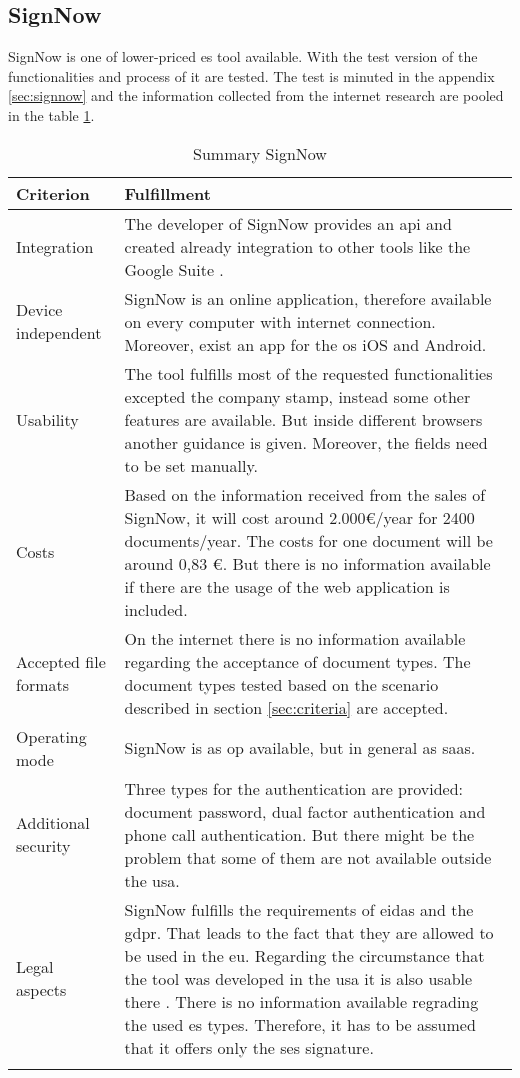 \subsection{SignNow}
SignNow is one of lower-priced \gls{es} tool available. With the test version of the functionalities and process of it are tested. The test is minuted in the appendix \ref{sec:signnow} and the information collected from the internet research are pooled in the table \ref{tab:signnow}.
	\begin{longtable}{|p{4cm}|p{10cm}|} \hline
		Criterion & Fulfillment \\ \hline
		Integration & The developer of SignNow provides an \gls{api} and created already integration to other tools like the Google Suite \parencite{signnow2018enterprise,signnow2018price}.\\ \hline
		Device independent & SignNow is an online application, therefore available on every computer with internet connection. Moreover, exist an \gls{app} for the \gls{os} iOS and Android.\\ \hline
		Usability & The tool fulfills most of the requested functionalities excepted the company stamp, instead some other features are available. But inside different browsers another guidance is given. Moreover, the fields need to be set manually.\\ \hline
		Costs & Based on the information received from the sales of SignNow, it will cost around 2.000\euro /year for 2400 documents/year. The costs for one document will be around 0,83 \euro. But there is no information available if there are the usage of the web application is included. \\ \hline
		Accepted file formats & On the internet there is no information available regarding the acceptance of document types. The document types tested based on the scenario described in section \ref{sec:criteria} are accepted.\\ \hline
		Operating mode & SignNow is as \gls{op} available, but in general as \gls{saas}. \parencite{signnow2018op} \\ \hline
		Additional security & Three types for the authentication are provided: document password, dual factor authentication and phone call authentication. But there might be the problem that some of them are not available outside the \gls{usa}. \parencite{signnow2018security} \\ \hline
		Legal aspects & SignNow fulfills the requirements of \gls{eidas} and the \gls{gdpr}. That leads to the fact that they are allowed to be used in the \gls{eu}. Regarding the circumstance that the tool was developed in the \gls{usa} it is also usable there \parencite{signnow2018legal}. There is no information available regrading the used \gls{es} types. Therefore, it has to be assumed that it offers only the \gls{ses} signature. \\ \hline
	\caption{Summary SignNow}
	\label{tab:signnow}
	\end{longtable}

